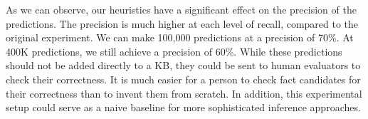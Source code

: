As we can observe, our heuristics have a significant effect on the precision of the predictions. 
The precision is much higher at each level of recall, compared to the original experiment. 
We can make 100,000 predictions at a precision of 70\%. At 400K predictions, we still achieve a precision of 60\%. 
While these predictions should not be added directly to a KB, they could be sent to human evaluators to check their correctness.
It is much easier for a person to check fact candidates for their correctness than to invent them from scratch.
In addition, this experimental setup could serve as a naive baseline for more sophisticated inference approaches.



%
%

